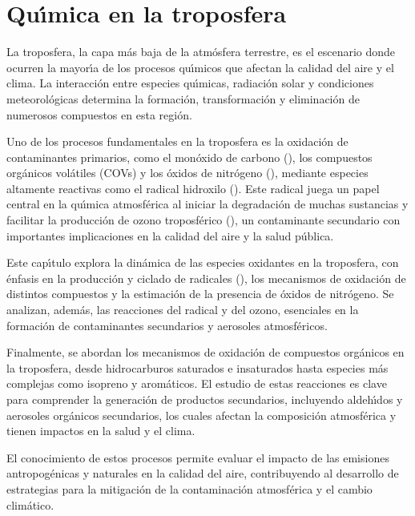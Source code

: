 %  
%  

\chapter[Quimica en la Troposfera]{Qu\'{\i}mica en la troposfera}
La troposfera, la capa m\'as baja de la atm\'osfera terrestre, es el escenario donde ocurren la mayor\'{\i}a de los procesos qu\'{\i}micos que afectan la calidad del aire y el clima. La interacci\'on entre especies qu\'{\i}micas, radiaci\'on solar y condiciones meteorol\'ogicas determina la formaci\'on, transformaci\'on y eliminaci\'on de numerosos compuestos en esta regi\'on.  

Uno de los procesos fundamentales en la troposfera es la oxidaci\'on de contaminantes primarios, como el mon\'oxido de carbono (), los compuestos org\'anicos vol\'atiles (\gls{COV}s) y los \'oxidos de nitr\'ogeno (), mediante especies altamente reactivas como el radical hidroxilo (). Este radical juega un papel central en la qu\'{\i}mica atmosf\'erica al iniciar la degradaci\'on de muchas sustancias y facilitar la producci\'on de ozono troposf\'erico (), un contaminante secundario con importantes implicaciones en la calidad del aire y la salud p\'ublica.

Este cap\'{\i}tulo explora la din\'amica de las especies oxidantes en la troposfera, con \'enfasis en la producci\'on y ciclado de radicales (), los mecanismos de oxidaci\'on de distintos compuestos y la estimaci\'on de la presencia de \'oxidos de nitr\'ogeno. Se analizan, adem\'as, las reacciones del radical  y del ozono, esenciales en la formaci\'on de contaminantes secundarios y aerosoles atmosf\'ericos.

Finalmente, se abordan los mecanismos de oxidaci\'on de compuestos org\'anicos en la troposfera, desde hidrocarburos saturados e insaturados hasta especies m\'as complejas como isopreno y arom\'aticos. El estudio de estas reacciones es clave para comprender la generaci\'on de productos secundarios, incluyendo aldeh\'{\i}dos y aerosoles org\'anicos secundarios, los cuales afectan la composici\'on atmosf\'erica y tienen impactos en la salud y el clima.

El conocimiento de estos procesos permite evaluar el impacto de las emisiones antropog\'enicas y naturales en la calidad del aire, contribuyendo al desarrollo de estrategias para la mitigaci\'on de la contaminaci\'on atmosf\'erica y el cambio clim\'atico.

